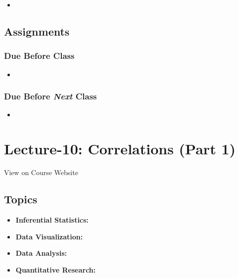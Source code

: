 \documentclass[]{book}
\providecommand{\tightlist}{%
  \setlength{\itemsep}{0pt}\setlength{\parskip}{0pt}}
\theoremstyle{definition}
\theoremstyle{definition}
\theoremstyle{definition}
\theoremstyle{remark}
\begin{document}
\begin{itemize}
\item
\end{itemize}

\subsection*{Assignments}\label{assignments-10}

\subsubsection*{Due Before Class}\label{due-before-class-8}

\begin{itemize}
\item
\end{itemize}

\subsubsection*{\texorpdfstring{Due Before \emph{Next}
Class}{Due Before Next Class}}\label{due-before-next-class-9}

\begin{itemize}
\item
\end{itemize}

\section{Lecture-10: Correlations (Part
1)}\label{lecture-10-correlations-part-1}

View on Course Website

\subsection*{Topics}\label{topics-10}

\begin{itemize}
\tightlist
\item
  \textbf{Inferential Statistics:}
\item
  \textbf{Data Visualization:}
\item
  \textbf{Data Analysis:}
\item
  \textbf{Quantitative Research:}
\end{itemize}
\end{document}
